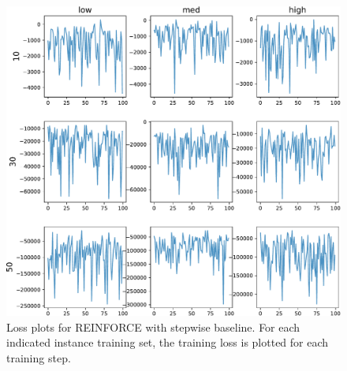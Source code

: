 \documentclass[a4paper]{article}
\theoremstyle{definition}
\theoremstyle{plain}
\begin{document}
\begin{figure}
  \centering
  \includegraphics[width=1.0\textwidth]{figures/single/rl_neural_stepwise_fit.pdf}
  \caption{ Loss plots for REINFORCE with stepwise baseline. For each indicated
    instance training set, the training loss is plotted for each training step.}
  \label{fig:rl_neural_stepwise_fit}
\end{figure}
\end{document}
